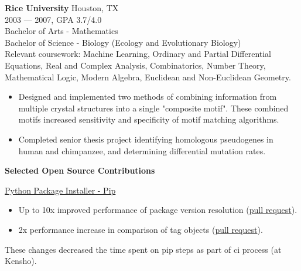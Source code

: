 \myfontsize{\bigheader}
\textbf{Rice University}
\myfontsize{\bodysize}
Houston, TX\\
2003 --- 2007, GPA 3.7/4.0\\
Bachelor of Arts - Mathematics\\
Bachelor of Science - Biology (Ecology and Evolutionary Biology)\\
Relevant coursework: Machine Learning, Ordinary and Partial Differential Equations, Real and Complex Analysis, Combinatorics, Number Theory, Mathematical Logic, Modern Algebra, Euclidean and Non-Euclidean Geometry.
\begin{itemize}[topsep=1ex, partopsep=0ex, parsep=0ex, itemsep=0.5ex]
    \item Designed and implemented two methods of combining information from multiple crystal structures into a single "composite motif". These combined motifs increased sensitivity and specificity of motif matching algorithms.
    \item Completed senior thesis project identifying homologous pseudogenes in human and chimpanzee, and determining differential mutation rates.
\end{itemize}

\myfontsize{\bigheader}
\textbf{Selected Open Source Contributions}
\myfontsize{\bodysize}\\


\vspace{\littleskip}
\vspace{\littleskip}

\href{https://github.com/pypa/pip}{Python Package Installer - Pip}\\
\begin{itemize}[topsep=1ex, partopsep=0ex, parsep=0ex, itemsep=0.5ex]
    \item Up to 10x improved performance of package version resolution (\href{https://github.com/pypa/pip/pull/9748}{pull request}).
    \item 2x performance increase in comparison of tag objects (\href{https://github.com/pypa/packaging/pull/417}{pull request}).
\end{itemize}
These changes decreased the time spent on pip steps as part of ci process (at Kensho).

